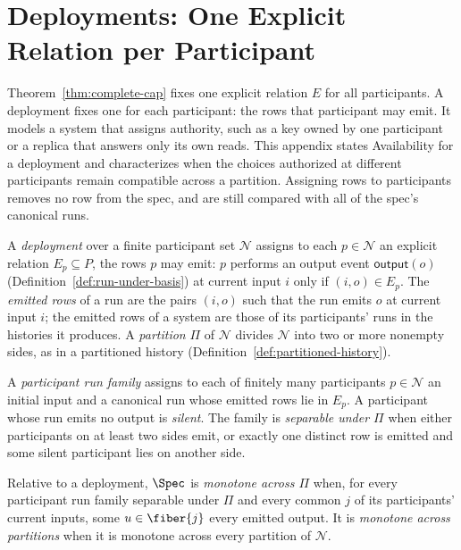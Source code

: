 \section{Deployments: One Explicit Relation per Participant}
\label{app:deployment}

Theorem~\ref{thm:complete-cap} fixes one explicit relation $E$ for all
participants.  A deployment fixes one for each participant: the rows that
participant may emit.  It models a system that assigns authority, such as a
key owned by one participant or a replica that answers only its own reads.
This appendix states Availability for a deployment and characterizes when the
choices authorized at different participants remain compatible across a
partition.  Assigning rows to participants removes no row from the spec, and
\commitments are still compared with all of the spec's canonical runs.

\begin{definition}
\label{def:deployment}\label{def:emitted-rows}
A \emph{deployment} over a finite participant set $\mathcal N$ assigns to each $p\in\mathcal N$
an explicit relation $E_p\subseteq P$, the rows $p$ may emit: $p$ performs an output event
$\mathsf{output}(o)$ (Definition~\ref{def:run-under-basis}) at current input
$i$ only if $(i,o)\in E_p$.  The \emph{emitted rows} of a run are the
pairs $(i,o)$ such that the run emits $o$ at current input $i$; the emitted
rows of a system are those of its participants' runs in the histories it
produces.  A \emph{partition} $\Pi$ of $\mathcal N$ divides $\mathcal N$ into
two or more nonempty sides, as in a partitioned history
(Definition~\ref{def:partitioned-history}).
\end{definition}

\begin{definition}
\label{def:participant-run-family}
A \emph{participant run family} assigns to each of finitely many participants
$p\in\mathcal N$ an initial input and a canonical run whose emitted rows lie in $E_p$.
A participant whose run emits no output is \emph{silent}.  The family is
\emph{separable under $\Pi$} when either participants on at least two
sides emit, or exactly one distinct row is emitted and some silent
participant lies on another side.
\end{definition}

\begin{definition}
\label{def:monotone-across-partitions}
Relative to a deployment, $\Spec$ is \emph{monotone across $\Pi$} when, for
every participant run family separable under $\Pi$ and every common \indesc $j$
of its participants' current inputs, some $u\in\fiber{j}$ \outrel every
emitted output.  It is \emph{monotone across partitions} when it is monotone
across every partition of $\mathcal N$.
\end{definition}

